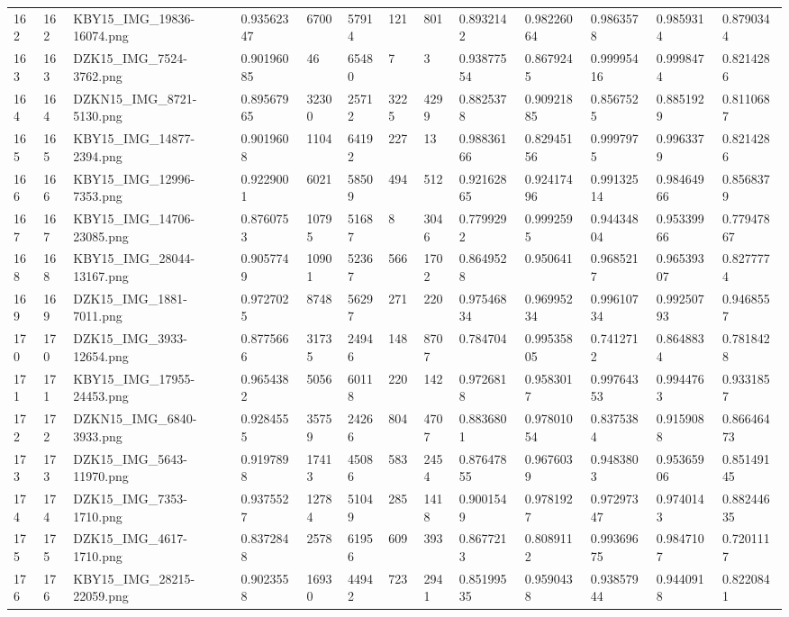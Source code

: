 \documentclass[11pt, a4paper, twoside]{report}
\begin{document}
\begin{longtable}[c]{@{}lllllllllllll@{}}
162 & 162 & KBY15\_IMG\_19836-16074.png & 0.93562347 & 6700 & 57914 & 121 & 801 & 0.8932142 & 0.98226064 & 0.9863578 & 0.9859314 & 0.8790344 \\
163 & 163 & DZK15\_IMG\_7524-3762.png & 0.90196085 & 46 & 65480 & 7 & 3 & 0.93877554 & 0.8679245 & 0.99995416 & 0.9998474 & 0.8214286 \\
164 & 164 & DZKN15\_IMG\_8721-5130.png & 0.89567965 & 32300 & 25712 & 3225 & 4299 & 0.8825378 & 0.90921885 & 0.8567525 & 0.8851929 & 0.8110687 \\
165 & 165 & KBY15\_IMG\_14877-2394.png & 0.9019608 & 1104 & 64192 & 227 & 13 & 0.98836166 & 0.82945156 & 0.9997975 & 0.9963379 & 0.8214286 \\
166 & 166 & KBY15\_IMG\_12996-7353.png & 0.9229001 & 6021 & 58509 & 494 & 512 & 0.92162865 & 0.92417496 & 0.99132514 & 0.98464966 & 0.8568379 \\
167 & 167 & KBY15\_IMG\_14706-23085.png & 0.8760753 & 10795 & 51687 & 8 & 3046 & 0.7799292 & 0.9992595 & 0.94434804 & 0.95339966 & 0.77947867 \\
168 & 168 & KBY15\_IMG\_28044-13167.png & 0.9057749 & 10901 & 52367 & 566 & 1702 & 0.8649528 & 0.950641 & 0.9685217 & 0.96539307 & 0.8277774 \\
169 & 169 & DZK15\_IMG\_1881-7011.png & 0.9727025 & 8748 & 56297 & 271 & 220 & 0.97546834 & 0.96995234 & 0.99610734 & 0.99250793 & 0.9468557 \\
170 & 170 & DZK15\_IMG\_3933-12654.png & 0.8775666 & 31735 & 24946 & 148 & 8707 & 0.784704 & 0.99535805 & 0.7412712 & 0.8648834 & 0.7818428 \\
171 & 171 & KBY15\_IMG\_17955-24453.png & 0.9654382 & 5056 & 60118 & 220 & 142 & 0.9726818 & 0.9583017 & 0.99764353 & 0.9944763 & 0.9331857 \\
172 & 172 & DZKN15\_IMG\_6840-3933.png & 0.9284555 & 35759 & 24266 & 804 & 4707 & 0.8836801 & 0.97801054 & 0.8375384 & 0.9159088 & 0.86646473 \\
173 & 173 & DZK15\_IMG\_5643-11970.png & 0.9197898 & 17413 & 45086 & 583 & 2454 & 0.87647855 & 0.9676039 & 0.9483803 & 0.95365906 & 0.85149145 \\
174 & 174 & DZK15\_IMG\_7353-1710.png & 0.9375527 & 12784 & 51049 & 285 & 1418 & 0.9001549 & 0.9781927 & 0.97297347 & 0.9740143 & 0.88244635 \\
175 & 175 & DZK15\_IMG\_4617-1710.png & 0.8372848 & 2578 & 61956 & 609 & 393 & 0.8677213 & 0.8089112 & 0.99369675 & 0.9847107 & 0.7201117 \\
176 & 176 & KBY15\_IMG\_28215-22059.png & 0.9023558 & 16930 & 44942 & 723 & 2941 & 0.85199535 & 0.9590438 & 0.93857944 & 0.9440918 & 0.8220841 \\

\end{longtable}
\end{document}
